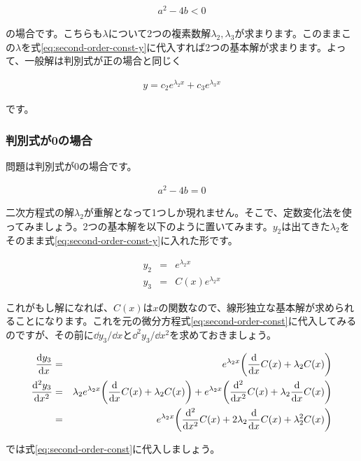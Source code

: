 \begin{eqnarray}
    a^2-4b<0
\end{eqnarray}

\noindent
の場合です。こちらも$\lambda$について2つの複素数解$\lambda_2, \lambda_3$が求まります。このままこの$\lambda$を式\ref{eq:second-order-const-y}に代入すれば2つの基本解が求まります。よって、一般解は判別式が正の場合と同じく

\begin{eqnarray}
    y=c_2e^{\lambda_2x}+c_3e^{\lambda_3x} \nonumber
\end{eqnarray}

\noindent
です。

\subsubsection{判別式が0の場合}
問題は判別式が0の場合です。

\begin{eqnarray}
    a^2-4b=0
    \label{eq:second-order-same}
\end{eqnarray}

二次方程式の解$\lambda_2$が重解となって1つしか現れません。そこで、定数変化法を使ってみましょう。2つの基本解を以下のように置いてみます。$y_2$は出てきた$\lambda_2$をそのまま式\ref{eq:second-order-const-y}に入れた形です。

\begin{eqnarray}
    y_2&=&e^{\lambda_2 x} \\
    y_3&=&C(x)e^{\lambda_2 x}
    \label{eq:second-order-const-y3}
\end{eqnarray}

これがもし解になれば、$C(x)$は$x$の関数なので、線形独立な基本解が求められることになります。これを元の微分方程式\ref{eq:second-order-const}に代入してみるのですが、その前に$\dd y_3/\dd x$と$\dd^2 y_3/\dd x^2$を求めておきましょう。

\begin{eqnarray}
    \frac{\dd y_3}{\dd x}&=&e^{\lambda_2 x}\pqty{\frac{\dd}{\dd x}C(x)+\lambda_2 C(x)} \\
    \frac{\dd^2 y_3}{\dd x^2}&=&\lambda_2 e^{\lambda_2 x}\pqty{\frac{\dd}{\dd x}C(x)+\lambda_2 C(x)}+e^{\lambda_2 x}\pqty{\frac{\dd^2}{\dd x^2}C(x)+\lambda_2 \frac{\dd}{\dd x}C(x)} \nonumber \\
    &=&e^{\lambda_2 x}\pqty{\frac{\dd^2}{\dd x^2}C(x)+2\lambda_2 \frac{\dd}{\dd x}C(x)+\lambda_2^2C(x)}
\end{eqnarray}

では式\ref{eq:second-order-const}に代入しましょう。

